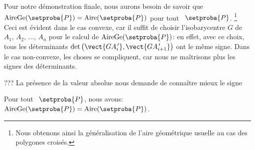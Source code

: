 Pour notre démonstration finale, nous aurons besoin de savoir que $\garea{\setproba{P}} = \area{\setproba{P}}$ pour tout \ngone\ $\setproba{P}$.%
\footnote{
	Nous obtenons ainsi la généralisation de l'aire géométrique usuelle au cas des polygones croisés.
}
Ceci est évident dans le cas convexe, car il suffit de choisir l'isobarycentre $G$ de $A_1$, $A_2$, ..., $A_n$ pour le calcul de $\garea{\setproba{P}}$: en effet, avec ce choix, tous les déterminants $\det \big( \vect{G A^{\,\prime}_i} , \vect{G A^{\,\prime}_{i+1}} \big)$ ont le même signe.
Dans le cas non-convexe, les choses se compliquent, car nous ne maîtrisons plus les signes des déterminants. 



???
La présence de la valeur absolue nous demande de connaître mieux le signe

    
    


\begin{fact}
    Pour tout \ngone\ $\setproba{P}$, nous avons: $\garea{\setproba{P}} = \area{\setproba{P}}$.
\end{fact}


